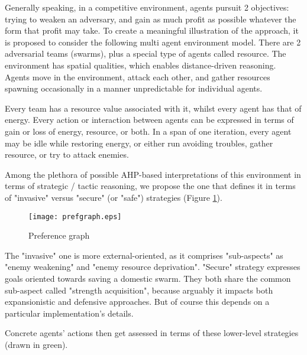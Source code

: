 Generally speaking, in a competitive environment, agents pursuit 2 objectives: trying to weaken an adversary, and gain
as much profit as possible whatever the form that profit may take. To create a meaningful illustration of the approach,
it is proposed to consider the following multi agent environment model. There are 2 adversarial teams (swarms), plus a
special type of agents called resource. The environment has spatial qualities, which enables distance-driven reasoning.
Agents move in the environment, attack each other, and gather resources spawning occasionally in a manner unpredictable
for individual agents.

Every team has a resource value associated with it, whilst every agent has that of energy. Every action or interaction
between agents can be expressed in terms of gain or loss of energy, resource, or both. In a span of one iteration, every
agent may be idle while restoring energy, or either run avoiding troubles, gather resource, or try to attack enemies.

Among the plethora of possible AHP-based interpretations of this environment in terms of strategic / tactic reasoning,
we propose the one that defines it in terms of "invasive" versus "secure" (or "safe") strategies (Figure
\ref{fig:df-models}).

\begin{figure}[hbt!]
    \centering
    \texttt{[image: prefgraph.eps]}

    \caption{\small Preference graph}
    \label{fig:df-models}
\end{figure}

The "invasive" one is more external-oriented, as it comprises "sub-aspects" as "enemy weakening" and "enemy resource
deprivation". "Secure" strategy expresses goals oriented towards saving a domestic swarm. They both share the common
sub-aspect called "strength acquisition", because arguably it impacts both expansionistic and defensive approaches. But
of course this depends on a particular implementation's details.

Concrete agents' actions then get assessed in terms of these lower-level strategies (drawn in green).